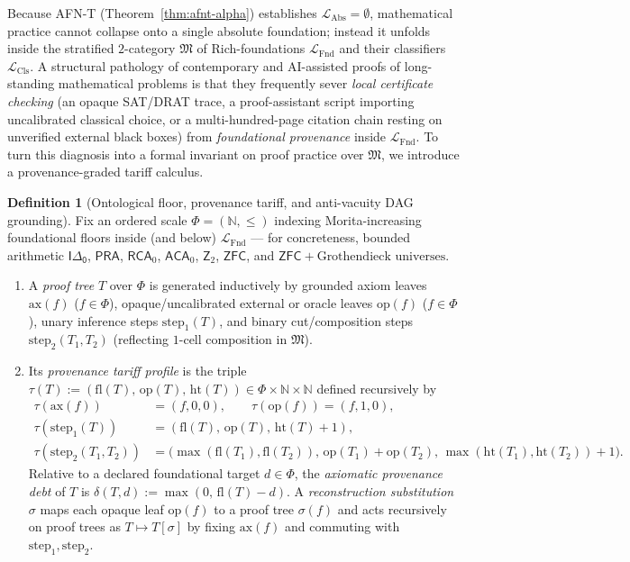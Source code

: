 \documentclass[11pt]{article}
\theoremstyle{plain}
\theoremstyle{definition}
\newtheorem{definition}[theorem]{Definition}
\newcommand{\fM}{\mathfrak{M}}
\newcommand{\LFnd}{\mathcal{L}_{\mathrm{Fnd}}}
\newcommand{\LCls}{\mathcal{L}_{\mathrm{Cls}}}
\newcommand{\LAbs}{\mathcal{L}_{\mathrm{Abs}}}
\newcommand{\ZFC}{\mathsf{ZFC}}
\begin{document}
Because AFN-T (Theorem~\ref{thm:afnt-alpha}) establishes $\LAbs = \emptyset$, mathematical practice cannot collapse onto a single absolute foundation; instead it unfolds inside the stratified $2$-category $\fM$ of Rich-foundations $\LFnd$ and their classifiers $\LCls$. A structural pathology of contemporary and AI-assisted proofs of long-standing mathematical problems is that they frequently sever \emph{local certificate checking} (an opaque SAT/DRAT trace, a proof-assistant script importing uncalibrated classical choice, or a multi-hundred-page citation chain resting on unverified external black boxes) from \emph{foundational provenance} inside $\LFnd$. To turn this diagnosis into a formal invariant on proof practice over $\fM$, we introduce a provenance-graded tariff calculus.

\begin{definition}[Ontological floor, provenance tariff, and anti-vacuity DAG grounding]\label{def:provenance-tariff}
Fix an ordered scale $\Phi = (\mathbb{N}, \le)$ indexing Morita-increasing foundational floors inside (and below) $\LFnd$ --- for concreteness, bounded arithmetic $\mathsf{I\Delta_0}$, $\mathsf{PRA}$, $\mathsf{RCA}_0$, $\mathsf{ACA}_0$, $\mathsf{Z}_2$, $\ZFC$, and $\ZFC + \text{Grothendieck universes}$.
\begin{enumerate}[nosep,label=(\roman*)]
\item A \emph{proof tree} $T$ over $\Phi$ is generated inductively by grounded axiom leaves $\mathrm{ax}(f)$ ($f \in \Phi$), opaque/uncalibrated external or oracle leaves $\mathrm{op}(f)$ ($f \in \Phi$), unary inference steps $\mathrm{step}_1(T)$, and binary cut/composition steps $\mathrm{step}_2(T_1, T_2)$ (reflecting $1$-cell composition in $\fM$).
\item Its \emph{provenance tariff profile} is the triple $\tau(T) := (\mathrm{fl}(T),\, \mathrm{op}(T),\, \mathrm{ht}(T)) \in \Phi \times \mathbb{N} \times \mathbb{N}$ defined recursively by
\[
\begin{aligned}
\tau(\mathrm{ax}(f)) &= (f, 0, 0), \qquad \tau(\mathrm{op}(f)) = (f, 1, 0),\\
\tau(\mathrm{step}_1(T)) &= (\mathrm{fl}(T),\, \mathrm{op}(T),\, \mathrm{ht}(T)+1),\\
\tau(\mathrm{step}_2(T_1, T_2)) &= \bigl(\max(\mathrm{fl}(T_1),\mathrm{fl}(T_2)),\, \mathrm{op}(T_1)+\mathrm{op}(T_2),\, \max(\mathrm{ht}(T_1),\mathrm{ht}(T_2))+1\bigr).
\end{aligned}
\]
Relative to a declared foundational target $d \in \Phi$, the \emph{axiomatic provenance debt} of $T$ is $\delta(T, d) := \max(0,\, \mathrm{fl}(T) - d)$. A \emph{reconstruction substitution} $\sigma$ maps each opaque leaf $\mathrm{op}(f)$ to a proof tree $\sigma(f)$ and acts recursively on proof trees as $T \mapsto T[\sigma]$ by fixing $\mathrm{ax}(f)$ and commuting with $\mathrm{step}_1, \mathrm{step}_2$.

\end{enumerate}
\end{definition}
\end{document}
